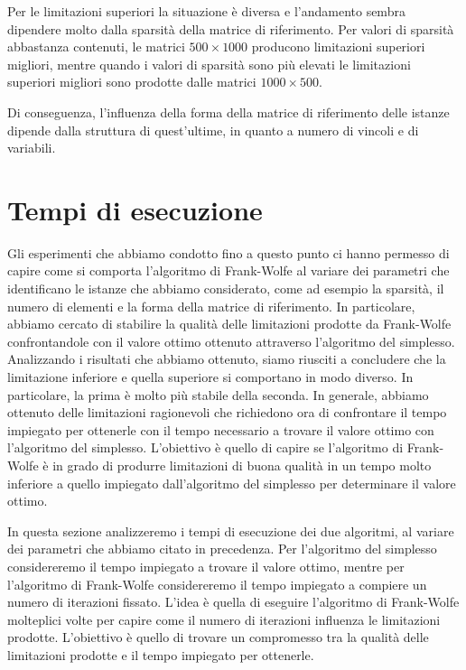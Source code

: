 Per le limitazioni superiori la situazione è diversa e l'andamento sembra dipendere molto dalla sparsità della
matrice di riferimento. Per valori di sparsità abbastanza contenuti, le matrici \( 500\times 1000 \) producono
limitazioni superiori migliori, mentre quando i valori di sparsità sono più elevati le limitazioni superiori migliori
sono prodotte dalle matrici  \( 1000\times 500 \).

Di conseguenza, l'influenza della forma della matrice di riferimento delle istanze dipende dalla struttura di
quest'ultime, in quanto a numero di vincoli e di variabili.

\section{Tempi di esecuzione}
Gli esperimenti che abbiamo condotto fino a questo punto ci hanno permesso di capire come si comporta l'algoritmo di
Frank-Wolfe al variare dei parametri che identificano le istanze che abbiamo considerato, come ad esempio la sparsità,
il numero di elementi e la forma della matrice di riferimento. In particolare, abbiamo cercato di stabilire la qualità
delle limitazioni prodotte da Frank-Wolfe confrontandole con il valore ottimo ottenuto attraverso l'algoritmo del
simplesso. Analizzando i risultati che abbiamo ottenuto, siamo riusciti a concludere che la limitazione inferiore e
quella superiore si comportano in modo diverso. In particolare, la prima è molto più stabile della seconda. In generale,
abbiamo ottenuto delle limitazioni ragionevoli che richiedono ora di confrontare il tempo impiegato per ottenerle con il
tempo necessario a trovare il valore ottimo con l'algoritmo del simplesso. L'obiettivo è quello di capire se
l'algoritmo di Frank-Wolfe è in grado di produrre limitazioni di buona qualità in un tempo molto inferiore a quello
impiegato dall'algoritmo del simplesso per determinare il valore ottimo.

In questa sezione analizzeremo i tempi di esecuzione dei due algoritmi, al variare dei parametri che abbiamo
citato in precedenza. Per l'algoritmo del simplesso considereremo il tempo impiegato a trovare il valore ottimo, mentre
per l'algoritmo di Frank-Wolfe considereremo il tempo impiegato a compiere un numero di iterazioni fissato. L'idea è
quella di eseguire l'algoritmo di Frank-Wolfe molteplici volte per capire come il numero di iterazioni influenza le
limitazioni prodotte. L'obiettivo è quello di trovare un compromesso tra la qualità delle limitazioni prodotte e il
tempo impiegato per ottenerle.

